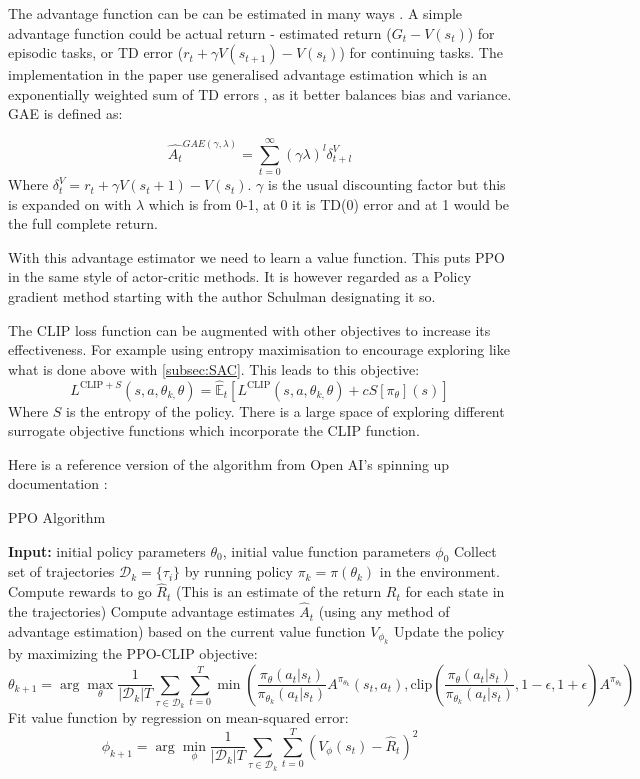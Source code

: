 The advantage function can be can be estimated in many ways . A simple advantage function could be actual return - estimated return ($G_{t} - V(s_{t})$) for episodic tasks, or TD error ($r_{t}+\gamma V(s_{t+1})-V(s_{t})$) for continuing tasks. The implementation in the paper use generalised advantage estimation which is an exponentially weighted sum of TD errors \cite{schulmanHighDimensionalContinuousControl2015}, as it better balances bias and variance. GAE is defined as:

$$
\hat{A_{t}}^{GAE(\gamma, \lambda)} = \sum_{t=0}^{\infty}(\gamma\lambda)^{l}\delta_{t+l}^{V}
$$
Where $\delta_{t}^{V}=r_{t}+\gamma V(s_{t}+1)-V(s_{t})$. $\gamma$ is the usual discounting factor but this is expanded on with $\lambda$ which is from 0-1, at 0 it is TD(0) error and at 1 would be the full complete return.

With this advantage estimator we need to learn a value function. This puts PPO in the same style of actor-critic methods. It is however regarded as a Policy gradient method starting with the author Schulman designating it so.

The CLIP loss function can be augmented with other objectives to increase its effectiveness. For example using entropy maximisation to encourage exploring like what is done above with \ref{subsec:SAC}. This leads to this objective:
$$
L^{\text{CLIP} + S}(s, a, \theta_{k, }\theta)=\hat{\mathbb{E}}_{t}\left[ L^{\text{CLIP}}(s,a, \theta_{k, }\theta)+cS\left[ \pi_{\theta}\right](s)  \right] 
$$
Where $S$ is the entropy of the policy. There is a large space of exploring different surrogate objective functions which incorporate the CLIP function.

Here is a reference version of the algorithm from Open AI's spinning up documentation \cite{openaiProximalPolicyOptimization2020}:

\begin{algorithm}
\caption{PPO Algorithm}
\begin{algorithmic}[1]
\State \textbf{Input:} initial policy parameters $\theta_{0}$, initial value function parameters $\phi_{0}$
    \State Collect set of trajectories $\mathcal{D}_{k} = \{\tau_{i}\}$ by running policy $\pi_{k} = \pi(\theta_{k})$ in the environment.
    \State Compute rewards to go $\hat{R}_{t}$ (This is an estimate of the return $R_{t}$ for each state in the trajectories)
    \State Compute advantage estimates $\hat{A}_{t}$ (using any method of advantage estimation) based on the current value function $V_{\phi_{k}}$
    \State Update the policy by maximizing the PPO-CLIP objective:
    $$
    \theta_{k+1} = \arg \max_{\theta} \frac{1}{|\mathcal{D}_{k}|T}\sum_{\tau \in  \mathcal{D}_{k}} \sum_{t=0}^{T} \min \left( \frac{\pi_{\theta}(a_{t}|s_{t})}{\pi_{\theta_{k}}(a_{t}|s_{t})} A^{\pi_{\theta_{k}}}(s_{t}, a_{t}), \text{clip} \left( \frac{\pi_{\theta}(a_{t}|s_{t})}{\pi_{\theta_{k}}(a_{t}|s_{t})}, 1-\epsilon, 1+\epsilon  \right) A^{\pi_{\theta_{k}}}  \right)
    $$
    \State Fit value function by regression on mean-squared error:
    $$
    \phi_{k+1} = \arg \min_{\phi} \frac{1}{|\mathcal{D}_{k}|T}\sum_{\tau \in  \mathcal{D}_{k}} \sum_{t=0}^{T} (V_{\phi}(s_{t})-\hat{R}_{t})^{2}
    $$
\EndFor
\end{algorithmic}
\end{algorithm}
